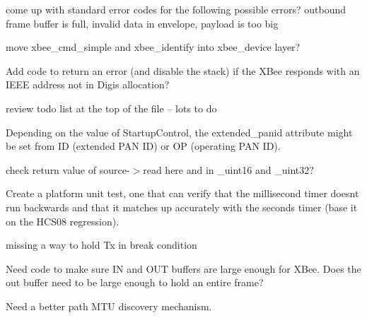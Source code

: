 \begin{DoxyRefList}
come up with standard error codes for the following possible errors? outbound frame buffer is full, invalid data in envelope, payload is too big  
\item[\label{todo__todo000006}%
\Hypertarget{todo__todo000006}%
File \hyperlink{xbee__atcmd_8c}{xbee\+\_\+atcmd.c} ]move xbee\+\_\+cmd\+\_\+simple and xbee\+\_\+identify into xbee\+\_\+device layer?

Add code to return an error (and disable the stack) if the X\+Bee responds with an I\+E\+EE address not in Digi\textquotesingle{}s allocation?

review todo list at the top of the file -- lots to do 
\item[\label{todo__todo000010}%
\Hypertarget{todo__todo000010}%
Global \hyperlink{group__xbee__commissioning_ga886012f757de4a74d0c992d3ab04a373}{xbee\+\_\+comm\+\_\+\+SC} (\hyperlink{structzcl__comm__startup__param__t}{zcl\+\_\+comm\+\_\+startup\+\_\+param\+\_\+t} F\+AR $\ast$p, const void F\+AR $\ast$value\+\_\+be)]Depending on the value of Startup\+Control, the extended\+\_\+panid attribute might be set from ID (extended P\+AN ID) or OP (operating P\+AN ID). 
\item[\label{todo__todo000011}%
\Hypertarget{todo__todo000011}%
Global \hyperlink{group__xbee__firmware_ga279def556401f533d798bb3896302ced}{xbee\+\_\+fw\+\_\+read\+\_\+byte} (\hyperlink{structxbee__fw__source__t}{xbee\+\_\+fw\+\_\+source\+\_\+t} $\ast$source)]check return value of source-\/$>$read here and in \+\_\+uint16 and \+\_\+uint32?  
\item[\label{todo__todo000001}%
\Hypertarget{todo__todo000001}%
File \hyperlink{xbee__platform__posix_8c}{xbee\+\_\+platform\+\_\+posix.c} ]Create a platform unit test, one that can verify that the millisecond timer doesn\textquotesingle{}t run backwards and that it matches up accurately with the seconds timer (base it on the H\+C\+S08 regression).  
\item[\label{todo__todo000002}%
\Hypertarget{todo__todo000002}%
File \hyperlink{xbee__serial__posix_8c}{xbee\+\_\+serial\+\_\+posix.c} ]missing a way to hold Tx in break condition  
\item[\label{todo__todo000003}%
\Hypertarget{todo__todo000003}%
File \hyperlink{xbee__serial__rabbit_8c}{xbee\+\_\+serial\+\_\+rabbit.c} ]Need code to make sure IN and O\+UT buffers are large enough for X\+Bee. Does the out buffer need to be large enough to hold an entire frame? 
\item[\label{todo__todo000004}%
\Hypertarget{todo__todo000004}%
File \hyperlink{xbee__sxa__socket_8c}{xbee\+\_\+sxa\+\_\+socket.c} ]Need a better path M\+TU discovery mechanism. 

\end{DoxyRefList}
